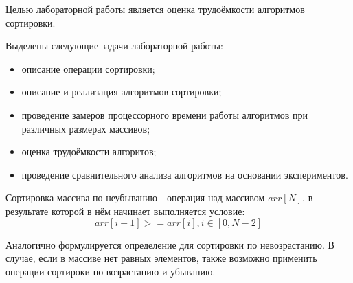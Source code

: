 Целью лабораторной работы является оценка трудоёмкости алгоритмов сортировки.

Выделены следующие задачи лабораторной работы:

\begin{itemize}
\item описание операции сортировки;
\item описание и реализация алгоритмов сортировки;
\item проведение замеров процессорного времени работы алгоритмов при различных размерах массивов;
\item оценка трудоёмкости алгоритов;
\item проведение сравнительного анализа алгоритмов на основании экспериментов.
\end{itemize}

Сортировка массива по неубыванию - операция над массивом $arr[N]$, в результате которой в нём начинает выполняется условие:
\begin{equation} 
	arr[i+1] >= arr[i], i \in [0, N-2]
\end{equation}

Аналогично формулируется определение для сортировки по невозрастанию. В случае, если в массиве нет равных элементов, также возможно применить операции сортироки по возрастанию и убыванию.
